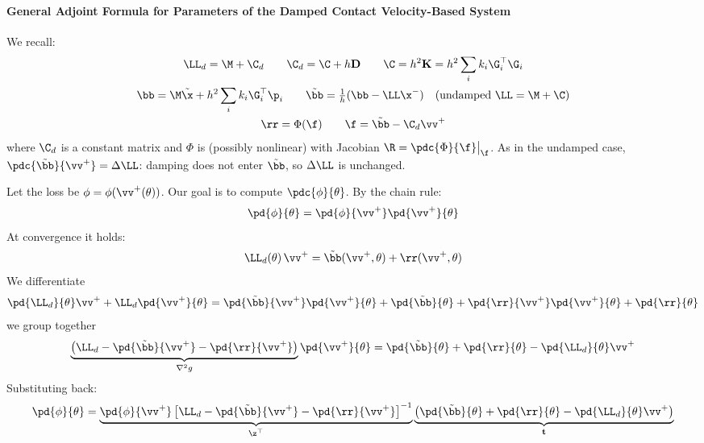 \begin{derivation}
\paragraph{General Adjoint Formula for Parameters of the Damped Contact Velocity-Based System}\mbox{}\par\medskip

\begin{reminder}
We recall:
\begin{gather*}
    \LL_d = \M + \C_d \qquad \C_d = \C + h\mathbf{D} \qquad \C = h^2\mathbf{K} = h^2\sum_i k_i\G_i^\top\G_i\\
    \bb = \M\tilde\x + h^2\sum_ik_i\G_i^\top\p_i
    \qquad \tilde\bb = \tfrac{1}{h}(\bb - \LL\x^-) \quad (\text{undamped } \LL = \M + \C)\\
    \rr = \Phi(\f) \qquad \f = \tilde\bb - \C_d\vv^+
\end{gather*}
where $\C_d$ is a constant matrix and $\Phi$ is (possibly nonlinear) with Jacobian $\R = \pdc{\Phi}{\f}\big|_\f$. As in the undamped case, $\pdc{\tilde\bb}{\vv^+} = \Delta\LL$: damping does not enter $\tilde\bb$, so $\Delta\LL$ is unchanged.
\end{reminder}
Let the loss be $\phi = \phi(\vv^+(\theta))$. Our goal is to compute $\pdc{\phi}{\theta}$.
\newline By the chain rule:
\begin{equation*}
    \pd{\phi}{\theta}
    =
    \pd{\phi}{\vv^+}
    \pd{\vv^+}{\theta}
\end{equation*}
At convergence it holds:
\begin{equation*}
    \LL_d(\theta)\,\vv^+ = \tilde\bb(\vv^+, \theta) + \rr(\vv^+, \theta)
\end{equation*}
We differentiate
\begin{equation*}
    \pd{\LL_d}{\theta}\vv^+ + \LL_d\pd{\vv^+}{\theta} =
    \pd{\tilde\bb}{\vv^+}\pd{\vv^+}{\theta} + \pd{\tilde\bb}{\theta} +
    \pd{\rr}{\vv^+}\pd{\vv^+}{\theta} + \pd{\rr}{\theta}
\end{equation*}
we group together
\begin{equation*}
    \underbrace{\left(\LL_d -\pd{\tilde\bb}{\vv^+} - \pd{\rr}{\vv^+}\right)}_{\nabla^2g}
     \pd{\vv^+}{\theta} =
     \pd{\tilde\bb}{\theta} + \pd{\rr}{\theta} - \pd{\LL_d}{\theta}\vv^+
\end{equation*}
Substituting back:
\begin{equation}
    \pd{\phi}{\theta} =
    \underbrace{\pd{\phi}{\vv^+}\left[ \LL_d -\pd{\tilde\bb}{\vv^+} - \pd{\rr}{\vv^+} \right]^{-1}}_{\z^\top}
    \underbrace{\left(\pd{\tilde\bb}{\theta} + \pd{\rr}{\theta} - \pd{\LL_d}{\theta}\vv^+\right)}_\mathbf{t}
\end{equation}


\end{derivation}
